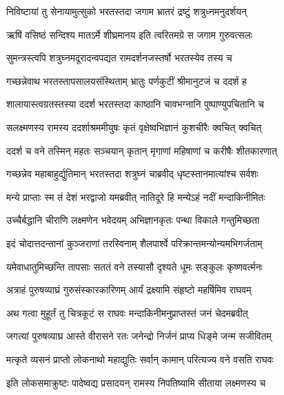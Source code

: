 
\twolineshloka
{निविष्टायां तु सेनायामुत्सुको भरतस्तदा}
{जगाम भ्रातरं द्रष्टुं शत्रुध्नमनुदर्शयन्} %

\twolineshloka
{ऋषिं वसिष्ठं सन्दिश्य मातऽर्मे शीघ्रमानय}
{इति त्वरितमग्रे स जगाम गुरुवत्सलः} %

\twolineshloka
{सुमन्त्रस्त्वपि शत्रुघ्नमदूरादन्वपद्यत}
{रामदर्शनजस्तर्षो भरतस्येव तस्य च} %

\twolineshloka
{गच्छन्नेवाथ भरतस्तापसालयसंस्थिताम्}
{भ्रातुः पर्णकुटीं श्रीमानुटजं च ददर्श ह} %

\twolineshloka
{शालायास्त्वग्रतस्तस्या ददर्श भरतस्तदा}
{काष्ठानि चावभग्नानि पुष्पाण्युपचितानि च} %

\twolineshloka
{सलक्ष्मणस्य रामस्य ददर्शाश्रममीयुषः}
{कृतं वृक्षेष्वभिज्ञानं कुशचीरैः क्वचित् क्वचित्} %

\twolineshloka
{ददर्श च वने तस्मिन् महतः सञ्चयान् कृतान्}
{मृगाणां महिषाणां च करीषैः शीतकारणात्} %

\twolineshloka
{गच्छन्नेव महाबाहुर्द्युतिमान् भरतस्तदा}
{शत्रुघ्नं चाब्रवीद् धृष्टस्तानमात्यांश्च सर्वशः} %

\twolineshloka
{मन्ये प्राप्ताः स्म तं देशं भरद्वाजो यमब्रवीत्}
{नातिदूरे हि मन्येऽहं नदीं मन्दाकिनीमितः} %

\twolineshloka
{उच्चैर्बद्धानि चीराणि लक्ष्मणेन भवेदयम्}
{अभिज्ञानकृतः पन्था विकाले गन्तुमिच्छता} %

\twolineshloka
{इदं चोदात्तदन्तानां कुञ्जराणां तरस्विनाम्}
{शैलपार्श्वे परिक्रान्तमन्योन्यमभिगर्जताम्} %

\twolineshloka
{यमेवाधातुमिच्छन्ति तापसाः सततं वने}
{तस्यासौ दृश्यते धूमः सङ्कुलः कृष्णवर्त्मनः} %

\twolineshloka
{अत्राहं पुरुषव्याघ्रं गुरुसंस्कारकारिणम्}
{आर्यं द्रक्ष्यामि संहृष्टो महर्षिमिव राघवम्} %

\twolineshloka
{अथ गत्वा मुहूर्तं तु चित्रकूटं स राघवः}
{मन्दाकिनीमनुप्राप्तस्तं जनं चेदमब्रवीत्} %

\twolineshloka
{जगत्यां पुरुषव्याघ्र आस्ते वीरासने रतः}
{जनेन्द्रो निर्जनं प्राप्य धिङ्मे जन्म सजीवितम्} %

\twolineshloka
{मत्कृते व्यसनं प्राप्तो लोकनाथो महाद्युतिः}
{सर्वान् कामान् परित्यज्य वने वसति राघवः} %

\twolineshloka
{इति लोकसमाक्रुष्टः पादेष्वद्य प्रसादयन्}
{रामस्य निपतिष्यामि सीताया लक्ष्मणस्य च} %

